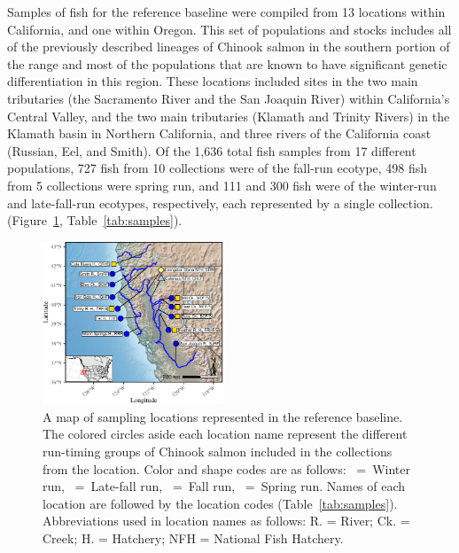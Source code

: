 Samples of fish for the reference baseline were compiled from 13 locations within California, and one
within Oregon. This set of populations and stocks includes all of the previously described lineages of Chinook salmon in the southern portion of the range and most of the populations that are known to have significant genetic differentiation in this region.
These locations included sites in the two
main tributaries (the Sacramento River and the San Joaquin River) within
California's Central Valley, and the two main tributaries (Klamath and Trinity Rivers) in the Klamath basin in Northern California, and
three rivers of the California coast (Russian, Eel, and Smith).
Of the 1,636 total fish samples from 17 different populations, 727 fish from 10 collections were of the fall-run ecotype,
498 fish from 5 collections were spring run, and 111 and 300 fish were of the winter-run and late-fall-run ecotypes, 
respectively,  each represented by a single collection.
(Figure~\ref{fig:map}, Table~\ref{tab:samples}).
\begin{figure}
\newcommand{\mapcap}{\footnotesize  A map of sampling locations represented in the reference
baseline.  The colored circles aside
each location name represent the different run-timing groups of Chinook salmon
included in the collections from the location.  Color and shape codes are as follows: \Wball~=~Winter run,
\LFball{}~=~Late-fall run, \Fball~=~Fall run, \Sball~=~Spring run.
Names of each location are followed by the location codes (Table~\ref{tab:samples}).
Abbreviations used in location names as follows:
R. = River; Ck. = Creek; H. = Hatchery; NFH = National Fish Hatchery.}
\begin{center}
\includegraphics[width=0.48\textwidth]{images/map-crop.pdf}
\end{center}
\caption[\mapcap]{\mapcap}
\label{fig:map}
\end{figure}

